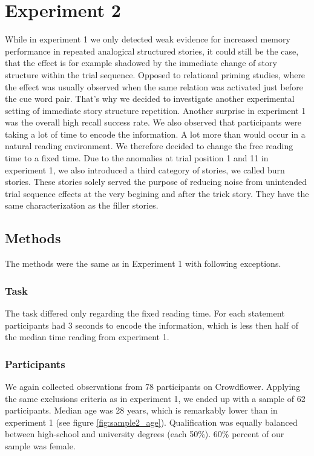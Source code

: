 \documentclass[a4paper,man,natbib,floatsintext,import]{apa6}
\begin{document}
\section{Experiment 2}
While in experiment 1 we only detected weak evidence for increased memory performance in repeated analogical structured stories, it could still be the case, that the effect is for example shadowed by the immediate change of story structure within the trial sequence. Opposed to relational priming studies, where the effect was usually observed when the same relation was activated just before the cue word pair. That's why we decided to investigate another experimental setting of immediate story structure repetition.
Another surprise in experiment 1 was the overall high recall success rate. We also observed that participants were taking a lot of time to encode the information. A lot more than would occur in a natural reading environment. We therefore decided to change the free reading time to a fixed time.
Due to the anomalies at trial position 1 and 11 in experiment 1, we also introduced a third category of stories, we called burn stories. These stories solely served the purpose of reducing noise from unintended trial sequence effects at the very begining and after the trick story. They have the same characterization as the filler stories.

\subsection{Methods}
The methods were the same as in Experiment 1 with following exceptions.

\subsubsection{Task}
The task differed only regarding the fixed reading time. For each statement participants had 3 seconds to encode the information, which is less then half of the median time reading from experiment 1.

\subsubsection{Participants}
We again collected observations from 78 participants on Crowdflower. Applying the same exclusions criteria as in experiment 1, we ended up with a sample of 62 participants. Median age was 28 years, which is remarkably lower than in experiment 1 (see figure \ref{fig:sample2_age}). Qualification was equally balanced between high-school and university degrees (each 50\%). 60\% percent of our sample was female.
\end{document}
